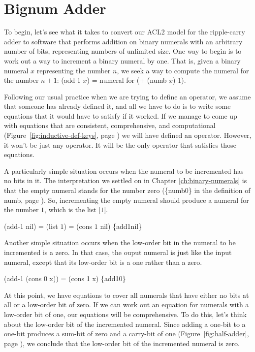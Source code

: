\section{Bignum Adder}
\label{sec:bignum-adder}

To begin, let's see what it takes to convert our ACL2 model for
the ripple-carry adder to software that performs addition on
binary numerals with an arbitrary number of bits,
representing numbers of unlimited size.
One way to begin is to work out a way to increment a
binary numeral by one. That is, given a binary numeral $x$ representing
the number $n$, we seek a way to compute the numeral for the number $n+1$:
(add-1 $x$) = numeral for (+ (numb $x$) 1).

Following our usual practice when we are trying to define an operator,
we assume that someone has already defined it,
and all we have to do is to write some equations that it
would have to satisfy if it worked. If we manage
to come up with equations that are consistent, comprehensive, and computational
(Figure~\ref{fig:inductive-def-keys}, page \pageref{fig:inductive-def-keys})
we will have defined an operator. 
However, it won't be just any operator.
It will be the only operator that satisfies those equations.

A particularly simple situation occurs when the numeral to be incremented
has no bits in it. The interpretation we settled on
in Chapter \ref{ch:binary-numerals} is that
the empty numeral stands for the number zero
(\{numb0\} in the definition of numb, page \pageref{nmb-defun}).
So, incrementing the empty numeral should produce a numeral for the number $1$,
which is the list [$1$].

\hspace{1cm}(add-1 nil) = (list $1$) = (cons $1$ nil)  \hfill \{add1nil\}

Another simple situation occurs when the low-order bit in the
numeral to be incremented is a zero.
In that case, the ouput numeral is
just like the input numeral, except that its
low-order bit is a one rather than a zero.

\hspace{1cm}  (add-1 (cons 0 x)) = (cons 1 x)    \hfill \{add10\}

At this point, we have equations to cover all numerals
that have either no bits at all or a low-order bit
of zero. If we can work out an equation for numerals
with a low-order bit of one, our equations will be comprehensive.
To do this, let's think about the
low-order bit of the incremented numeral.
Since adding a one-bit to a one-bit produces a sum-bit
of zero and a carry-bit of one
(Figure~\ref{fig:half-adder}, page \pageref{fig:half-adder}),
we conclude that the low-order bit of the incremented numeral
is zero.


